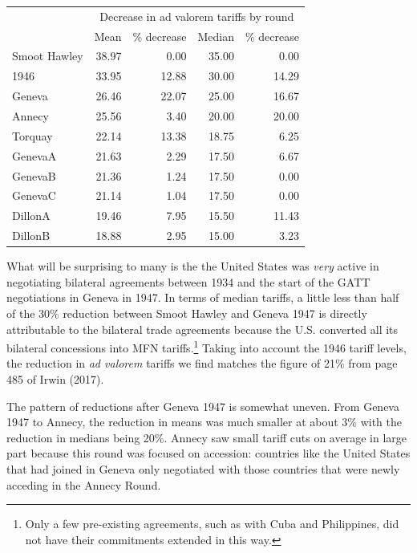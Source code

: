 \documentclass[
  12pt,
]{article}
\begin{document}
\begin{table}[!h]
\centering
\begin{tabular}[t]{lrrrr}
\toprule
\multicolumn{1}{c}{\bgroup\fontsize{12}{14}\selectfont  \egroup{}} & \multicolumn{4}{c}{\bgroup\fontsize{12}{14}\selectfont Decrease in ad valorem tariffs by round\egroup{}} \\
\cmidrule(l{3pt}r{3pt}){2-5}
  & Mean & \% decrease & Median & \% decrease\\
\midrule
Smoot Hawley & 38.97 & 0.00 & 35.00 & 0.00\\
1946 & 33.95 & 12.88 & 30.00 & 14.29\\
Geneva & 26.46 & 22.07 & 25.00 & 16.67\\
Annecy & 25.56 & 3.40 & 20.00 & 20.00\\
Torquay & 22.14 & 13.38 & 18.75 & 6.25\\
\addlinespace
GenevaA & 21.63 & 2.29 & 17.50 & 6.67\\
GenevaB & 21.36 & 1.24 & 17.50 & 0.00\\
GenevaC & 21.14 & 1.04 & 17.50 & 0.00\\
DillonA & 19.46 & 7.95 & 15.50 & 11.43\\
DillonB & 18.88 & 2.95 & 15.00 & 3.23\\
\bottomrule
\end{tabular}
\end{table}

What will be surprising to many is the the United States was \emph{very} active in negotiating bilateral agreements between 1934 and the start of the GATT negotiations in Geneva in 1947. In terms of median tariffs, a little less than half of the 30\% reduction between Smoot Hawley and Geneva 1947 is directly attributable to the bilateral trade agreements because the U.S. converted all its bilateral concessions into MFN tariffs.\footnote{Only a few pre-existing agreements, such as with Cuba and Philippines, did not have their commitments extended in this way.} Taking into account the 1946 tariff levels, the reduction in \emph{ad valorem} tariffs we find matches the figure of 21\% from page 485 of Irwin (2017).

The pattern of reductions after Geneva 1947 is somewhat uneven. From Geneva 1947 to Annecy, the reduction in means was much smaller at about 3\% with the reduction in medians being 20\%. Annecy saw small tariff cuts on average in large part because this round was focused on accession: countries like the United States that had joined in Geneva only negotiated with those countries that were newly acceding in the Annecy Round.
\end{document}
